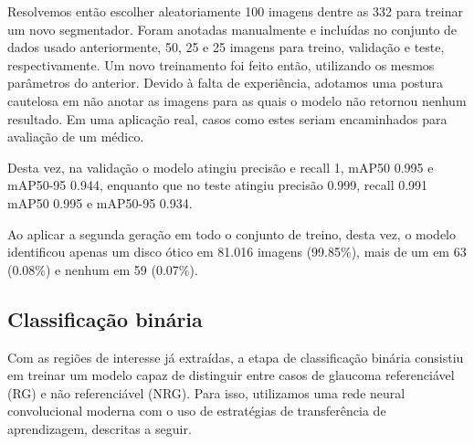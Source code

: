\documentclass[12pt]{article}
\begin{document}
Resolvemos então escolher aleatoriamente 100 imagens dentre as 332 para treinar um novo segmentador. Foram anotadas manualmente e incluídas no conjunto de dados usado anteriormente, 50, 25 e 25 imagens para treino, validação e teste, respectivamente. Um novo treinamento foi feito então, utilizando os mesmos parâmetros do anterior. Devido à falta de experiência, adotamos uma postura cautelosa em não anotar as imagens para as quais o modelo não retornou nenhum resultado. Em uma aplicação real, casos como estes seriam encaminhados para avaliação de um médico. 

Desta vez, na validação o modelo atingiu precisão e recall 1, mAP50 0.995 e mAP50-95 0.944, enquanto que no teste atingiu precisão 0.999, recall 0.991 mAP50 0.995 e mAP50-95 0.934.

Ao aplicar a segunda geração em todo o conjunto de treino, desta vez, o modelo identificou apenas um disco ótico em 81.016 imagens (99.85\%), mais de um em 63 (0.08\%) e nenhum em 59 (0.07\%).






\subsection{Classificação binária}
\label{sec:binary_classification}


Com as regiões de interesse já extraídas, a etapa de classificação binária consistiu em treinar um modelo capaz de distinguir entre casos de glaucoma referenciável (RG) e não referenciável (NRG). Para isso, utilizamos uma rede neural convolucional moderna com o uso de estratégias de transferência de aprendizagem, descritas a seguir.
\end{document}
